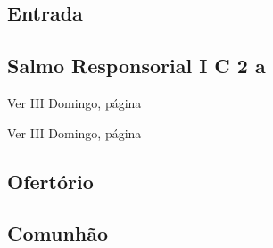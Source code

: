 
\subsection{Entrada}\label{subsection:proprium-sanctorum/in-transfiguratione-domini/introitus}

\AllowPageFlush

\subsection[Salmo Responsorial I]{Salmo Responsorial I \textmd{C 2 a}}\label{subsection:proprium-sanctorum/in-transfiguratione-domini/psalmus-responsorius}

\AllowPageFlush

\begin{rubrica}
  Ver III Domingo, página~\pageref{subsection:tempus-quadragesimae/dominica-1/psalmus-responsorius-2}
\end{rubrica}

\begin{rubrica}
  Ver III Domingo, página~\pageref{subsection:tempus-quadragesimae/dominica-1/antiphona-acclamationis}
\end{rubrica}


\subsection{Ofertório}\label{subsection:proprium-sanctorum/in-transfiguratione-domini/offertorium}

\AllowPageFlush

\subsection{Comunhão}\label{subsection:proprium-sanctorum/in-transfiguratione-domini/communio}
